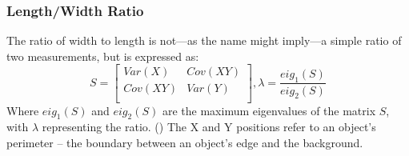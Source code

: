 \documentclass[letterpaper, notitlepage]{report}
\begin{document}
{%

\subsubsection{Length/Width Ratio}
\label{sec:length-width-ratio}
The ratio of width to length is not---as the name might imply---a simple ratio of two measurements, but is expressed as:
\begin{equation}
S = 
	\begin{bmatrix}
	Var(X) & Cov(XY) \\[0.3em]
	Cov(XY) & Var(Y) \\[0.3em]
	\end{bmatrix},
\lambda = \frac {eig_{1}(S)} {eig_{2}(S)}
\end{equation}
Where $eig_{1}(S)$ and $eig_{2}(S)$ are the maximum eigenvalues of the matrix $S$, with $\lambda$ representing the ratio. (\cite{Lin2017-xq}) The X and Y positions refer to an object's perimeter -- the boundary between an object's edge and the background.



}
\end{document}
